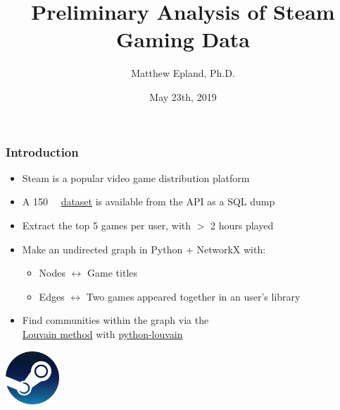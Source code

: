 \documentclass[18pt,xcolor=table]{beamer} \usefonttheme[onlymath]{serif}
\title[Preliminary Steam Analysis]{Preliminary Analysis of Steam Gaming Data}
\author[Epland]{Matthew Epland, Ph.D.}
\date{May 23th, 2019}
\begin{document}
\frame{\titlepage} 

\begin{frame}
  \frametitle{Introduction}
  \begin{itemize}
    \item Steam is a popular video game distribution platform
\vspace{0.2cm}
    \item A \SI{150}{\giga\byte} \href{http://steam.internet.byu.edu/}{dataset} is available from the API as a SQL dump
\vspace{0.2cm}
    \item Extract the top 5 games per user, with $>$ 2 hours played
\vspace{0.2cm}
    \item Make an undirected graph in Python + NetworkX with:
    \begin{itemize}
      \item Nodes $\leftrightarrow$ Game titles
      \vspace{0.1cm}
      \item Edges $\leftrightarrow$ Two games appeared together in an user's library
    \end{itemize}
\vspace{0.2cm}
    \item Find communities within the graph via the\\\href{http://stacks.iop.org/1742-5468/2008/i=10/a=P10008}{Louvain method} with \href{http://github.com/taynaud/python-louvain}{python-louvain}
  \end{itemize}
\vspace{0.23cm}
  \centering
  \includegraphics[width=0.15\textwidth]{steam_logo.png}
  \vspace{-0.3cm}
\end{frame}
\end{document}
